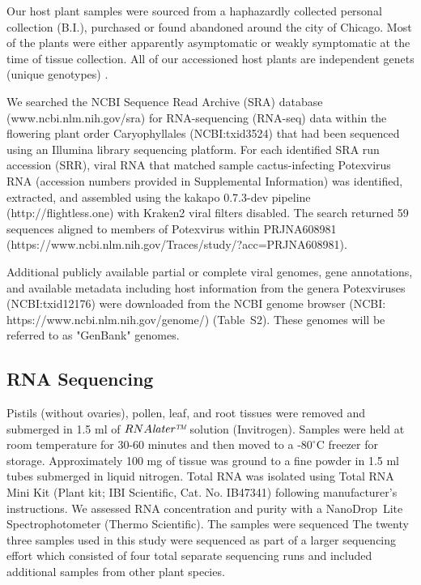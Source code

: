 \documentclass[fleqn,10pt,lineno]{wlpeerj}
\begin{document}
Our host plant samples were sourced from a haphazardly collected personal collection (B.I.), purchased or found abandoned around the city of Chicago. 
Most of the plants were either apparently asymptomatic or weakly symptomatic at the time of tissue collection.
All of our accessioned host plants are independent genets (unique genotypes) \citep{ramanauskas2021}.


We searched the NCBI Sequence Read Archive (SRA) database (www.ncbi.nlm.nih.gov/sra) for RNA-sequencing (RNA-seq) data within the flowering plant order Caryophyllales (NCBI:txid3524) that had been sequenced using an Illumina library sequencing platform. 
For each identified SRA run accession (SRR), viral RNA that matched sample cactus-infecting Potexvirus RNA (accession numbers provided in Supplemental Information) was identified, extracted, and assembled using the kakapo 0.7.3-dev pipeline (http://flightless.one) with Kraken2 viral filters disabled. 
The search returned 59 sequences aligned to members of Potexvirus within PRJNA608981 (https://www.ncbi.nlm.nih.gov/Traces/study/?acc=PRJNA608981).


Additional publicly available partial or complete viral genomes, gene annotations, and available metadata including host information from the genera Potexviruses (NCBI:txid12176) were downloaded from the NCBI genome browser (NCBI: https://www.ncbi.nlm.nih.gov/genome/) (Table~S2).
These genomes will be referred to as "GenBank" genomes.

\subsection*{RNA Sequencing}


Pistils (without ovaries), pollen, leaf, and root tissues were removed and submerged in 1.5 ml of $RNA\textit{later\texttrademark}$ solution (Invitrogen).
Samples were held at room temperature for 30-60 minutes and then moved to a -$80^{\circ}$C freezer for storage.
Approximately 100 mg of tissue was ground to a fine powder in 1.5 ml tubes submerged in liquid nitrogen.
Total RNA was isolated using Total RNA Mini Kit (Plant kit; IBI Scientific, Cat. No. IB47341) following manufacturer's instructions.
We assessed RNA concentration and purity with a NanoDrop\texttrademark~Lite Spectrophotometer (Thermo Scientific).
The samples were sequenced
The twenty three samples used in this study were sequenced as part of a larger sequencing effort which consisted of four total separate sequencing runs and included additional samples from other plant species. 
\end{document}

